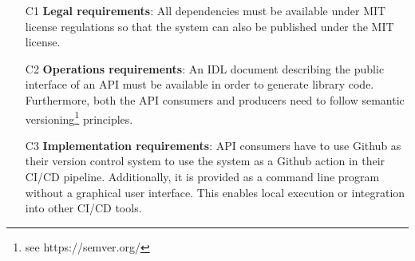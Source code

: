 \begin{itemize}[itemindent=-13pt, leftmargin=43pt, align=left]
    \item [C1\hphantom{1}]  \textbf{Legal requirements}: All dependencies must be available under MIT license regulations so that the system can also be published under the MIT license.
    \item [C2\hphantom{1}]  \textbf{Operations requirements}: An IDL document describing the public interface of an API must be available in order to generate library code. Furthermore, both the API consumers and producers need to follow semantic versioning\footnote{see https://semver.org/} principles.
    \item [C3\hphantom{1}]  \textbf{Implementation requirements}: API consumers have to use Github as their version control system to use the system as a Github action in their CI/CD pipeline. Additionally, it is provided as a command line program without a graphical user interface. This enables local execution or integration into other CI/CD tools.
\end{itemize}
